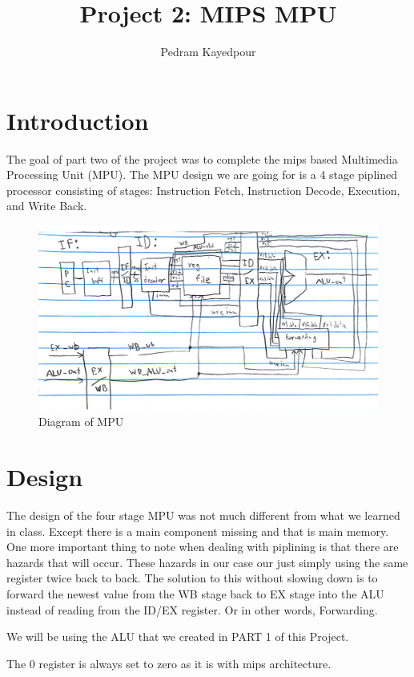 \documentclass{article}
\title{Project 2: MIPS MPU}
\author{Pedram Kayedpour}
\begin{document}
\maketitle

\section{Introduction}

The goal of part two of the project was to complete the mips based Multimedia Processing Unit (MPU). The MPU design we are going for is a 4 stage piplined processor consisting of stages: Instruction Fetch, Instruction Decode, Execution, and Write Back.

\begin{figure}
	\centering
	\includegraphics[width=1\linewidth]{diagram.png}
	\caption{Diagram of MPU}
	\label{fig:diagram}
\end{figure}

\section{Design}

The design of the four stage MPU was not much different from what we learned in class. Except there is a main component missing and that is main memory. One more important thing to note when dealing with piplining is that there are hazards that will occur. These hazards in our case our just simply using the same register twice back to back. The solution to this without slowing down is to forward the newest value from the WB stage back to EX stage into the ALU instead of reading from the ID/EX register. Or in other words, Forwarding.

We will be using the ALU that we created in PART 1 of this Project.

The 0 register is always set to zero as it is with mips architecture.
\end{document}
